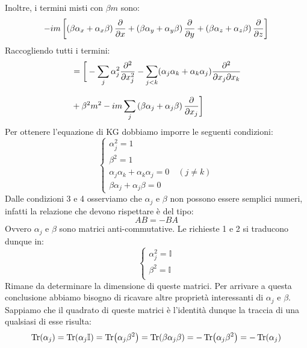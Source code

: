 Inoltre, i termini misti con $\beta m $ sono:
\begin{equation}
    -im \sqbr{\brackets{\beta \alpha_x + \alpha_x \beta}\pdv{}{x} + \brackets{\beta \alpha_y + \alpha_y \beta}\pdv{}{y} + \brackets{\beta \alpha_z + \alpha_z \beta}\pdv{}{z}}\\[8pt]
\end{equation}
Raccogliendo tutti i termini:
\begin{equation}
    \begin{split}
        &= \bigg[
                -\sum_{j} \alpha_j^2 \pdv[2]{}{x_j}
                - \sum_{j<k} (\alpha_j\alpha_k + \alpha_k\alpha_j) \pdv{}{x_j}{x_k}\\[8pt]
                &+ \beta^2 m^2
                - i m \sum_j \brackets{\beta \alpha_j + \alpha_j\beta} \pdv{}{x_j}
        \bigg]
    \end{split}
\end{equation}
Per ottenere l'equazione di KG dobbiamo imporre le seguenti condizioni:
\begin{equation}
    \begin{cases}
        \alpha_j^2 = 1 \\[8pt]
        \beta^2 = 1 \\[8pt]
        \alpha_j\alpha_k + \alpha_k\alpha_j = 0 \quad (j \neq k) \\[8pt]
        \beta\alpha_j + \alpha_j\beta = 0
    \end{cases}
\end{equation}
Dalle condizioni 3 e 4 osserviamo che $\alpha_j$ e $\beta$ non possono essere semplici numeri, infatti la relazione che devono rispettare è del tipo:
\begin{equation}
    AB = - BA
\end{equation}
Ovvero $\alpha_j$ e $\beta$ sono matrici anti-commutative. Le richieste 1 e 2 si traducono dunque in:
\begin{equation}
    \begin{cases}
        \alpha_j^2 = \mathbb{I} \\[8pt]
        \beta^2 = \mathbb{I} \\[8pt]
    \end{cases}
\end{equation}
Rimane da determinare la dimensione di queste matrici. Per arrivare a questa conclusione abbiamo bisogno di ricavare altre proprietà interessanti di $\alpha_j$ e $\beta$. Sappiamo che il quadrato di queste matrici è l'identità dunque la traccia di una qualsiasi di esse risulta:
\begin{equation}
    \Tr (\alpha_j) = \Tr (\alpha_j \mathbb{I}) = \Tr (\alpha_j \beta^2) = \Tr (\beta \alpha_j \beta) = -\Tr (\alpha_j \beta^2) = - \Tr (\alpha_j)
\end{equation}
